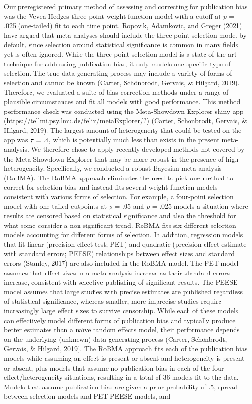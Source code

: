 \documentclass[
  english,
  man, donotrepeattitle,mask,floatsintext]{apa7}
\begin{document}
Our preregistered primary method of assessing and correcting for publication bias was the Vevea-Hedges three-point weight function model with a cutoff at \emph{p} = .025 (one-tailed) fit to each time point. Ropovik, Adamkovic, and Greger (2021) have argued that meta-analyses should include the three-point selection model by default, since selection around statistical significance is common in many fields yet is often ignored. While the three-point selection model is a state-of-the-art technique for addressing publication bias, it only models one specific type of selection. The true data generating process may include a variety of forms of selection and cannot be known (Carter, Schönbrodt, Gervais, \& Hilgard, 2019). Therefore, we evaluated a suite of bias correction methods under a range of plausible circumstances and fit all models with good performance. This method performance check was conducted using the Meta-Showdown Explorer shiny app (\url{https://tellmi.psy.lmu.de/felix/metaExplorer/}?) (Carter, Schönbrodt, Gervais, \& Hilgard, 2019). The largest amount of heterogeneity that could be tested on the app was \(\small\tau = .4\), which is potentially much less than exists in the present meta-analysis. We therefore chose to apply recently developed methods not covered by the Meta-Showdown Explorer that may be more robust in the presence of high heterogeneity. Specifically, we conducted a robust Bayesian meta-analysis (RoBMA). The RoBMA approach eliminates the need to pick one method to correct for selection bias and instead fits several weight-function models consistent with various forms of selection. For example, a four-point selection model with one-tailed cutpoints at \emph{p} = .05 and \emph{p} = .025 models a situation where results are censored based on statistical significance and also the threshold for what some consider a non-significant trend. RoBMA fits six different selection models accounting for different forms of selection. In addition, regression models that fit linear (precision effect test; PET) and quadratic (precision effect estimate with standard errors; PEESE) relationships between effect sizes and standard errors (Stanley, 2017) are also included in the RoBMA model. The PET model assumes that effect sizes in a meta-analysis increase as their standard errors increase, consistent with selective publishing of significant results. The PEESE model assumes that large studies with precise estimates are published regardless of statistical significance, whereas smaller, more imprecise studies require increasingly large effect sizes to survive censorship. While each of these models can effectively model different forms of publication bias and typically produce better estimates than a naïve random effects model, their performance depends on the underlying (unknown) data generating process (Carter, Schönbrodt, Gervais, \& Hilgard, 2019). The RoBMA approach fits each of the publication bias models while assuming an effect is present or absent and heterogeneity is present or absent, plus models that assume no publication bias in each of the four effect/heterogeneity situations, resulting in a total of 36 models fit to the data. Models that assume publication bias are given a prior probability of .5, spread between selection models and PET-PEESE models, and 
\end{document}
